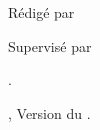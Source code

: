 \vspace*{\fill}%
\begin{center}
  \vspace*{\fill}%
\makebox[\linewidth]{\HRule} %
\parbox[t]{\linewidth}{\addvspace{\parskip} %
\centering\huge\bfseries\thetitle}
 \null%
\vspace*{\parskip}
\makebox[\linewidth]{\HRule}
\vspace*{\fill}
\begin{figure}[!h]
\centering
\begin{subfigure}{0.5\textwidth}
\centering

\end{subfigure}%
%
\end{figure}
\vspace{\fill}
\par \Large Rédigé par \theauthor%
\par Supervisé par \thesupervisor \par
\vspace*{\fill}
\large{\theyearname.\par \theuniversity, Version du \thedate.}
\end{center}
